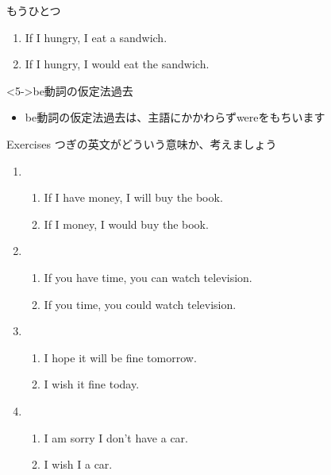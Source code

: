 \documentclass[aspectratio=169,xcolor={dvipsnames,table}]{beamer}
\begin{document}
\begin{frame}[plain]{もうひとつ}
 \begin{enumerate}
  \item<1-> If I  hungry, I  eat a sandwich.%
\hfill{}
  \item<3-> If I  hungry, I would eat the sandwich.%
\hfill{}\\
\hfill{}
 \end{enumerate}

\vfill

\begin{block}<5->{be動詞の仮定法過去}
\small

\begin{itemize}
 \item be動詞の仮定法過去は、主語にかかわらずwereをもちいます
\end{itemize}
\end{block}
\mbox{}\hfill{} 

\end{frame}
\begin{frame}[plain]{Exercises}
 つぎの英文がどういう意味か、考えましょう\mbox{}\hfill{} 



\begin{enumerate}
 \item \begin{enumerate}
	\item If I have money, I will buy the book. 
	\item If I  money, I would buy the book.
       \end{enumerate}
 \item \begin{enumerate}
	\item If you have time, you can watch television.
	\item If you  time, you could watch television.
       \end{enumerate}
 \item \begin{enumerate}
	\item I hope it will be fine tomorrow.
	\item I wish it  fine today.
       \end{enumerate}
 \item \begin{enumerate}
	\item I am sorry I don't have a car.
	\item I wish I  a car.
       \end{enumerate}
\end{enumerate}
\end{frame}
\end{document}
